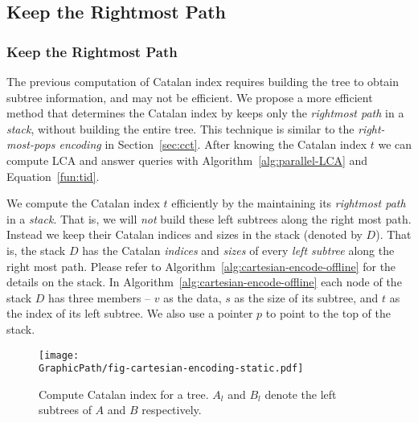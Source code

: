 \ifdefined\MasterThesis
\subsection{Keep the Rightmost Path}
\else
\subsubsection{Keep the Rightmost Path}
\fi

The previous computation of Catalan index requires building the tree
to obtain subtree information, and may not be efficient.  We propose a
more efficient method that determines the Catalan index by keeps only
the {\em rightmost path} in a {\em stack}, without building the entire
tree.  This technique is similar to the {\em right-most-pops encoding}
in Section~\ref{sec:cct}.  After knowing the Catalan index $t$ we can
compute LCA and answer queries with Algorithm~\ref{alg:parallel-LCA}
and Equation~\ref{fun:tid}.

We compute the Catalan index $t$ efficiently by the maintaining its
{\em rightmost path} in a {\em stack}.  That is, we will {\em not}
build these left subtrees along the right most path.  Instead we keep
their Catalan indices and sizes in the stack (denoted by $D$).  That
is, the stack $D$ has the Catalan {\em indices} and {\em sizes} of
every {\em left subtree} along the right most path.  Please refer to
Algorithm~\ref{alg:cartesian-encode-offline} for the details on the
stack.  In Algorithm~\ref{alg:cartesian-encode-offline} each node of
the stack $D$ has three members -- $v$ as the data, $s$ as the size of
its subtree, and $t$ as the index of its left subtree.  We also use a
pointer $p$ to point to the top of the stack.



\begin{figure}[!thb]
  \centering
  \texttt{[image: \\GraphicPath/fig-cartesian-encoding-static.pdf]}
  \caption{Compute Catalan index for a tree.  $A_l$ and $B_l$ denote
    the left subtrees of $A$ and $B$ respectively.}
  \label{fig:fig-cartesian-encoding-static}
\end{figure}

